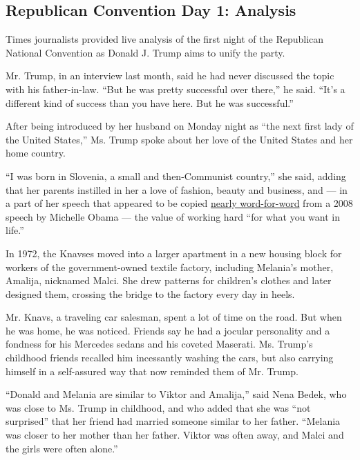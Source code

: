 \hypertarget{republican-convention-day-1-analysis}{%
\subsection{Republican Convention Day 1:
Analysis}\label{republican-convention-day-1-analysis}}

Times journalists provided live analysis of the first night of the
Republican National Convention as Donald J. Trump aims to unify the
party.

Mr. Trump, in an interview last month, said he had never discussed the
topic with his father-in-law. ``But he was pretty successful over
there,'' he said. ``It's a different kind of success than you have here.
But he was successful.''

After being introduced by her husband on Monday night as ``the next
first lady of the United States,'' Ms. Trump spoke about her love of the
United States and her home country.

``I was born in Slovenia, a small and then-Communist country,'' she
said, adding that her parents instilled in her a love of fashion, beauty
and business, and --- in a part of her speech that appeared to be copied
\href{https://twitter.com/JarrettHill/status/755242423991709697}{nearly
word-for-word} from a 2008 speech by Michelle Obama --- the value of
working hard ``for what you want in life.''

In 1972, the Knavses moved into a larger apartment in a new housing
block for workers of the government-owned textile factory, including
Melania's mother, Amalija, nicknamed Malci. She drew patterns for
children's clothes and later designed them, crossing the bridge to the
factory every day in heels.

Mr. Knavs, a traveling car salesman, spent a lot of time on the road.
But when he was home, he was noticed. Friends say he had a jocular
personality and a fondness for his Mercedes sedans and his coveted
Maserati. Ms. Trump's childhood friends recalled him incessantly washing
the cars, but also carrying himself in a self-assured way that now
reminded them of Mr. Trump.

``Donald and Melania are similar to Viktor and Amalija,'' said Nena
Bedek, who was close to Ms. Trump in childhood, and who added that she
was ``not surprised'' that her friend had married someone similar to her
father. ``Melania was closer to her mother than her father. Viktor was
often away, and Malci and the girls were often alone.''

